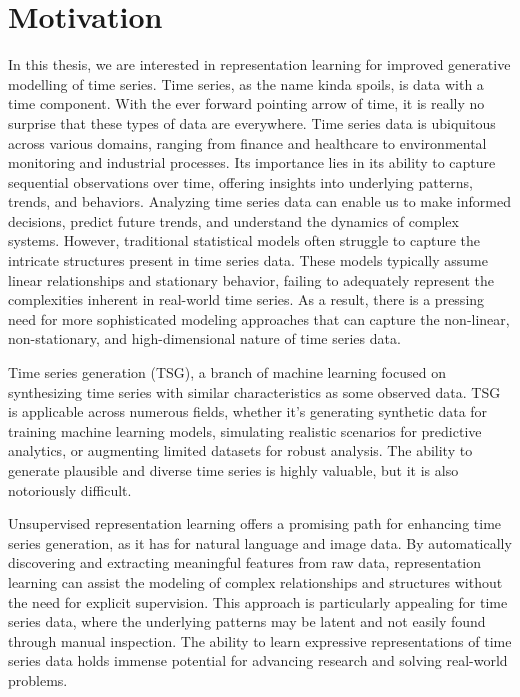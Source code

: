 \documentclass[../../thesis.tex]{subfiles}
\begin{document}
\section{Motivation}

In this thesis, we are interested in representation learning for improved generative modelling of time series. Time series, as the name kinda spoils, is data with a time component. With the ever forward pointing arrow of time, it is really no surprise that these types of data are everywhere. Time series data is ubiquitous across various domains, ranging from finance and healthcare to environmental monitoring and industrial processes. Its importance lies in its ability to capture sequential observations over time, offering insights into underlying patterns, trends, and behaviors. Analyzing time series data can enable us to make informed decisions, predict future trends, and understand the dynamics of complex systems. However, traditional statistical models often struggle to capture the intricate structures present in time series data. These models typically assume linear relationships and stationary behavior, failing to adequately represent the complexities inherent in real-world time series. As a result, there is a pressing need for more sophisticated modeling approaches that can capture the non-linear, non-stationary, and high-dimensional nature of time series data.\newline

Time series generation (TSG), a branch of machine learning focused on synthesizing time series with similar characteristics as some observed data. TSG is applicable across numerous fields, whether it's generating synthetic data for training machine learning models, simulating realistic scenarios for predictive analytics, or augmenting limited datasets for robust analysis. The ability to generate plausible and diverse time series is highly valuable, but it is also notoriously difficult.\newline

Unsupervised representation learning offers a promising path for enhancing time series generation, as it has for natural language and image data. By automatically discovering and extracting meaningful features from raw data, representation learning can assist the modeling of complex relationships and structures without the need for explicit supervision. This approach is particularly appealing for time series data, where the underlying patterns may be latent and not easily found through manual inspection. The ability to learn expressive representations of time series data holds immense potential for advancing research and solving real-world problems.
\end{document}
